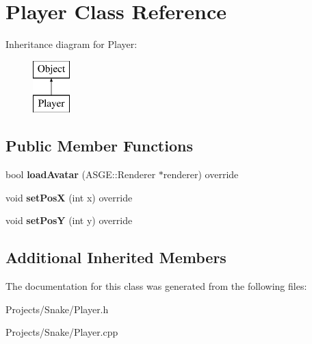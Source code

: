 \hypertarget{class_player}{}\section{Player Class Reference}
\label{class_player}
Inheritance diagram for Player\+:\begin{figure}[H]
\begin{center}
\leavevmode
\includegraphics[height=2.000000cm]{class_player}
\end{center}
\end{figure}
\subsection*{Public Member Functions}
\begin{DoxyCompactItemize}
\item 
\mbox{\label{class_player_a7ab05ae8247764445129cb8bb217f0cd}} 
bool {\bfseries load\+Avatar} (A\+S\+G\+E\+::\+Renderer $\ast$renderer) override
\item 
\mbox{\label{class_player_a88996d2766d3ecc89b8ec55a2ad30430}} 
void {\bfseries set\+PosX} (int x) override
\item 
\mbox{\label{class_player_a3736298c940755ead531cce66213d691}} 
void {\bfseries set\+PosY} (int y) override
\end{DoxyCompactItemize}
\subsection*{Additional Inherited Members}


The documentation for this class was generated from the following files\+:\begin{DoxyCompactItemize}
\item 
Projects/\+Snake/Player.\+h\item 
Projects/\+Snake/Player.\+cpp\end{DoxyCompactItemize}
